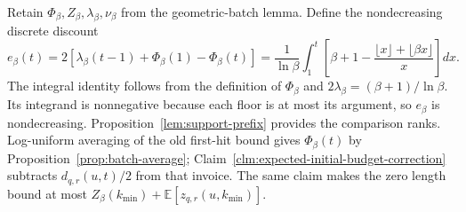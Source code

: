 Retain $\Phi_\beta,Z_\beta,\lambda_\beta,\nu_\beta$ from the
geometric-batch lemma. Define the nondecreasing discrete discount
\[
 e_\beta(t)=2[\lambda_\beta(t-1)+\Phi_\beta(1)-\Phi_\beta(t)]
 =\frac1{\ln\beta}\int_1^t
   \left[\beta+1-\frac{\lfloor x\rfloor+\lfloor\beta x\rfloor}{x}\right]dx.
\]
The integral identity follows from the definition of $\Phi_\beta$
and $2\lambda_\beta=(\beta+1)/\ln\beta$. Its integrand is
nonnegative because each floor is at most its argument, so
$e_\beta$ is nondecreasing. Proposition~\ref{lem:support-prefix}
provides the comparison ranks. Log-uniform averaging of the old
first-hit bound gives $\Phi_\beta(t)$ by
Proposition~\ref{prop:batch-average};
Claim~\ref{clm:expected-initial-budget-correction} subtracts
$d_{q,r}(u,t)/2$ from that invoice. The same claim makes the
zero length bound at most
$Z_\beta(k_{\min})+\mathbb E[z_{q,r}(u,k_{\min})]$.

